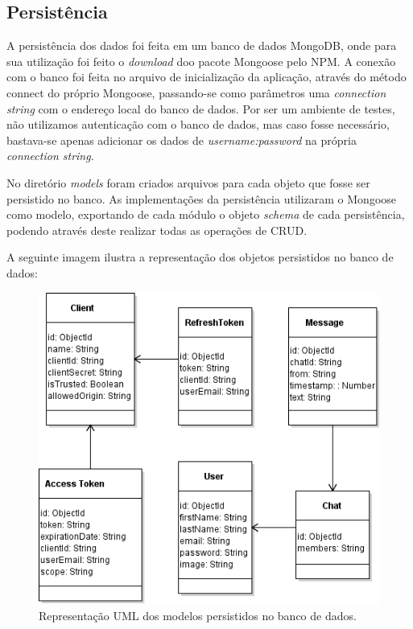 \subsection{Persistência}
A persistência dos dados foi feita em um banco de dados MongoDB, onde para sua utilização foi feito o \textit{download} doo pacote Mongoose pelo NPM. A conexão com o banco foi feita no arquivo de inicialização da aplicação, através do método connect do próprio Mongoose, passando-se como parâmetros uma \textit{connection string} com o endereço local do banco de dados. Por ser um ambiente de testes, não utilizamos autenticação com o banco de dados, mas caso fosse necessário, bastava-se apenas adicionar os dados de \textit{username:password} na própria \textit{connection string}.

No diretório \textit{models} foram criados arquivos para cada objeto que fosse ser persistido no banco. As implementações da persistência utilizaram o Mongoose como modelo, exportando de cada módulo o objeto \textit{schema} de cada persistência, podendo através deste realizar todas as operações de CRUD.

A seguinte imagem ilustra a representação dos objetos persistidos no banco de dados:

\begin{figure}[!htb]
	\centering
	\includegraphics[scale=0.85]{imagens/models_uml.png}
	\caption{\small Representação UML dos modelos persistidos no banco de dados.}
	\label{fig:modelsuml}
\end{figure}


